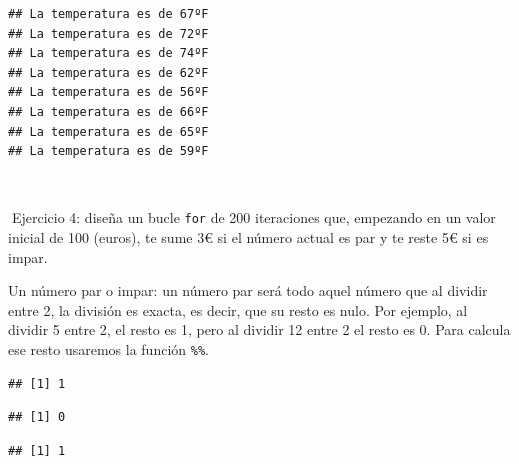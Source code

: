 \documentclass[11pt,]{book}
\newenvironment{Shaded}{\begin{snugshade}}{\end{snugshade}}
\newcommand{\DecValTok}[1]{\textcolor[rgb]{0.06,0.06,0.06}{#1}}
\newcommand{\OperatorTok}[1]{\textcolor[rgb]{0.43,0.43,0.43}{\textbf{#1}}}
\newcommand{\StringTok}[1]{\textcolor[rgb]{0.5,0.5,0.5}{#1}}
\begin{document}
\begin{verbatim}
## La temperatura es de 67ºF
## La temperatura es de 72ºF
## La temperatura es de 74ºF
## La temperatura es de 62ºF
## La temperatura es de 56ºF
## La temperatura es de 66ºF
## La temperatura es de 65ºF
## La temperatura es de 59ºF
\end{verbatim}

~

📝Ejercicio 4: diseña un bucle \texttt{for} de 200 iteraciones que, empezando en un valor inicial de 100 (euros), te sume 3€ si el número actual es par y te reste 5€ si es impar.

Un número par o impar: un número par será todo aquel número que al dividir entre 2, la división es exacta, es decir, que su resto es nulo. Por ejemplo, al dividir 5 entre 2, el resto es 1, pero al dividir 12 entre 2 el resto es 0. Para calcula ese resto usaremos la función \texttt{\%\%}.

\begin{Shaded}
\end{Shaded}

\begin{verbatim}
## [1] 1
\end{verbatim}

\begin{Shaded}
\end{Shaded}

\begin{verbatim}
## [1] 0
\end{verbatim}

\begin{Shaded}
\end{Shaded}

\begin{verbatim}
## [1] 1
\end{verbatim}

\begin{Shaded}
\end{Shaded}
\end{document}
